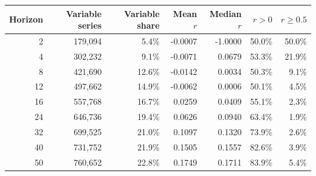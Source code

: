 \begin{tabular}{rrrrrrr}
\hline
Horizon & Variable series & Variable share & Mean $r$ & Median $r$ & $r>0$ & $r\ge0.5$ \\
\hline
2 & 179,094 & 5.4\% & -0.0007 & -1.0000 & 50.0\% & 50.0\% \\
4 & 302,232 & 9.1\% & -0.0071 & 0.0679 & 53.3\% & 21.9\% \\
8 & 421,690 & 12.6\% & -0.0142 & 0.0034 & 50.3\% & 9.1\% \\
12 & 497,662 & 14.9\% & -0.0062 & 0.0006 & 50.1\% & 4.5\% \\
16 & 557,768 & 16.7\% & 0.0259 & 0.0409 & 55.1\% & 2.3\% \\
24 & 646,736 & 19.4\% & 0.0626 & 0.0940 & 63.4\% & 1.9\% \\
32 & 699,525 & 21.0\% & 0.1097 & 0.1320 & 73.9\% & 2.6\% \\
40 & 731,752 & 21.9\% & 0.1505 & 0.1557 & 82.6\% & 3.9\% \\
50 & 760,652 & 22.8\% & 0.1749 & 0.1711 & 83.9\% & 5.4\% \\
\hline
\end{tabular}
